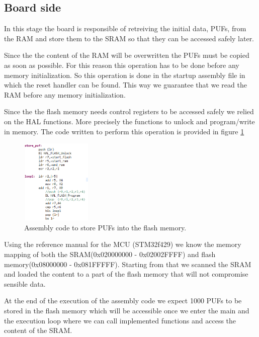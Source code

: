 \subsection{Board side}

In this stage the board is responsible of retreiving the initial data, PUFs, from the RAM and store them to the SRAM so that they can be accessed safely later.

Since the the content of the RAM will be overwritten the PUFs must be copied as soon as possible. For this reason this operation has to be done before any memory initialization. So this operation is done in the startup assembly file in which the reset handler can be found. This way we guarantee that we read the RAM before any memory initialization.

Since the the flash memory needs control registers to be accessed safely we relied on the HAL functions. More precisely the functions to unlock and program/write in memory. The code written to perform this operation is provided in figure \ref{fig:code_assembly}

\begin{figure}[h!]
	\vspace{0.5cm}
	\includegraphics[width = 0.3\textwidth]{images/code_assembly.png}
	\caption{Assembly code to store PUFs into the flash memory. }
	\label{fig:code_assembly}
\end{figure}

Using the reference manual for the MCU (STM32f429) we know the memory mapping of both the SRAM(0x020000000 -  0x02002FFFF) and flash memory(0x08000000 - 0x081FFFFF). Starting from that we scanned the SRAM and loaded the content to a part of the flash memory that will not compromise sensible data.

At the end of the execution of the assembly code we expect 1000 PUFs to be stored in the flash memory which will be accessible once we enter the main and the execution loop where we can call implemented functions and access the content of the SRAM.

